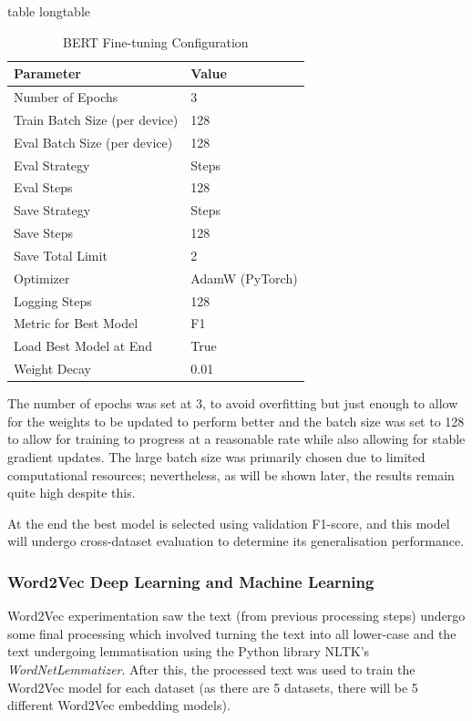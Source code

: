 \documentclass[stu,12pt,floatsintext,donotrepeattitle]{apa7}
\makeatletter
\let\origcaption\caption
\newcommand{\@tabletype}{table}
\newcommand{\@longtabletype}{longtable}
\DeclareRobustCommand{\caption}[2][]{%
    \ifx\relax#1\relax
      \origcaption{#2}%
      \def\temp@cap{#2}%
    \else
      \origcaption[#1]{#2}%
      \def\temp@cap{#1}%
    \fi
    \ifx\@captype\@tabletype
      \ifx\@currenvir\@longtabletype\else
        \addcontentsline{lot}{table}{\protect\numberline{\thetable}{\ignorespaces\temp@cap}}%
      \fi
    \fi
  }%
\let\oldcaption\caption
\renewcommand{\caption}[2][]{%
    \oldcaption[#1]{#2}%
    \vspace{-12pt}%
  }%
\makeatother
\begin{document}
\vspace{25pt}

\begin{table}[H]
    \centering
    \caption{BERT Fine-tuning Configuration}
    \label{tab:bert_finetune_config}
    \begin{tabular}{l l}
        \hline
        \textbf{Parameter} & \textbf{Value} \\
        \hline
        Number of Epochs & 3 \\
        Train Batch Size (per device) & 128 \\
        Eval Batch Size (per device) & 128 \\
        Eval Strategy & Steps \\
        Eval Steps & 128 \\
        Save Strategy & Steps \\
        Save Steps & 128 \\
        Save Total Limit & 2 \\
        Optimizer & AdamW (PyTorch) \\
        Logging Steps & 128 \\
        Metric for Best Model & F1 \\
        Load Best Model at End & True \\
        Weight Decay & 0.01 \\
        \hline
    \end{tabular}
\end{table}

The number of epochs was set at 3, to avoid overfitting but just enough to allow for the weights to be updated to perform better and the batch size was set to 128 to allow for training to progress at a reasonable rate while also allowing for stable gradient updates. The large batch size was primarily chosen due to limited computational resources; nevertheless, as will be shown later, the results remain quite high despite this.

At the end the best model is selected using validation F1-score, and this model will undergo cross-dataset evaluation to determine its generalisation performance.

\subsubsection{Word2Vec Deep Learning and Machine Learning}
Word2Vec experimentation saw the text (from previous processing steps) undergo some final processing which involved turning the text into all lower-case and the text undergoing lemmatisation using the Python library NLTK's \textit{WordNetLemmatizer}. After this, the processed text was used to train the Word2Vec model for each dataset (as there are 5 datasets, there will be 5 different Word2Vec embedding models).
\end{document}
